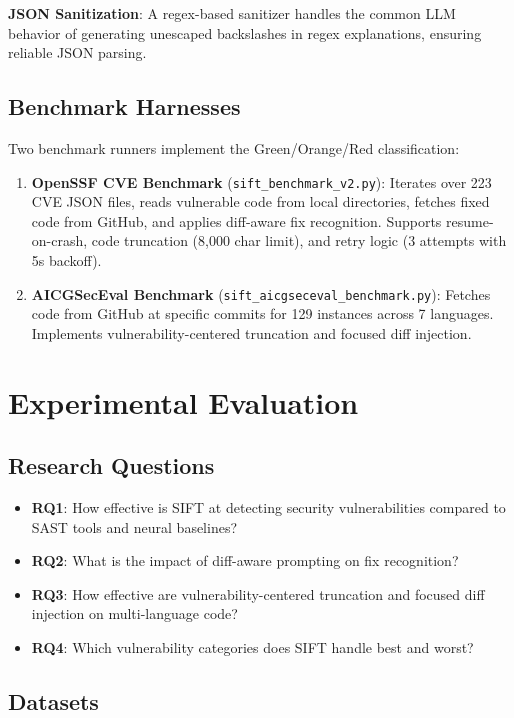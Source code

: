\documentclass[conference]{IEEEtran}
\begin{document}
\textbf{JSON Sanitization}: A regex-based sanitizer handles the common LLM behavior of generating unescaped backslashes in regex explanations, ensuring reliable JSON parsing.

\subsection{Benchmark Harnesses}

Two benchmark runners implement the Green/Orange/Red classification:

\begin{enumerate}
\item \textbf{OpenSSF CVE Benchmark} (\texttt{sift\_benchmark\_v2.py}): Iterates over 223 CVE JSON files, reads vulnerable code from local directories, fetches fixed code from GitHub, and applies diff-aware fix recognition. Supports resume-on-crash, code truncation (8,000 char limit), and retry logic (3 attempts with 5s backoff).
\item \textbf{AICGSecEval Benchmark} (\texttt{sift\_aicgseceval\_benchmark.py}): Fetches code from GitHub at specific commits for 129 instances across 7 languages. Implements vulnerability-centered truncation and focused diff injection.
\end{enumerate}

\section{Experimental Evaluation}

\subsection{Research Questions}

\begin{itemize}
\item \textbf{RQ1}: How effective is SIFT at detecting security vulnerabilities compared to SAST tools and neural baselines?
\item \textbf{RQ2}: What is the impact of diff-aware prompting on fix recognition?
\item \textbf{RQ3}: How effective are vulnerability-centered truncation and focused diff injection on multi-language code?
\item \textbf{RQ4}: Which vulnerability categories does SIFT handle best and worst?
\end{itemize}

\subsection{Datasets}
\end{document}
